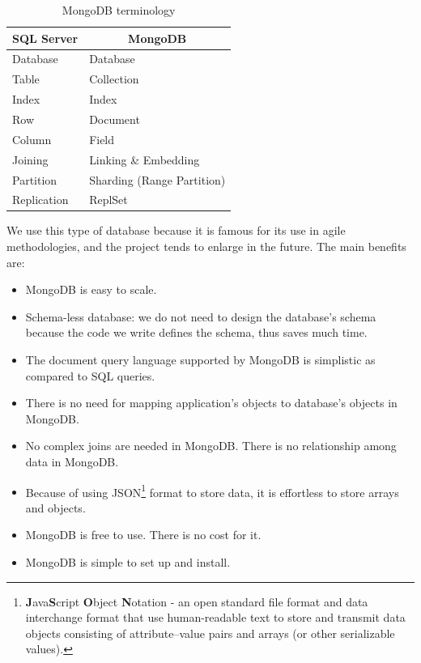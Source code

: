 \begin{table}[H]
	\centering
    \begin{tabular}{|l|l|}
        \hline
        \multicolumn{1}{c}{\bfseries SQL Server} & \multicolumn{1}{c}{\bfseries MongoDB} \\ \hline
        \multicolumn{1}{|l|}{Database}  & \multicolumn{1}{l|}{Database} \\ \hline
        \multicolumn{1}{|l|}{Table}  & \multicolumn{1}{l|}{Collection} \\ \hline
        \multicolumn{1}{|l|}{Index}  & \multicolumn{1}{l|}{Index} \\ \hline
        \multicolumn{1}{|l|}{Row}  & \multicolumn{1}{l|}{Document} \\ \hline
        \multicolumn{1}{|l|}{Column}  & \multicolumn{1}{l|}{Field} \\ \hline
        \multicolumn{1}{|l|}{Joining}  & \multicolumn{1}{l|}{Linking \& Embedding} \\ \hline
        \multicolumn{1}{|l|}{Partition}  & \multicolumn{1}{l|}{Sharding (Range Partition)} \\ \hline
        \multicolumn{1}{|l|}{Replication}  & \multicolumn{1}{l|}{ReplSet} \\ \hline
    \end{tabular}
	\caption{MongoDB terminology}
	\label{tab:mongoDB_terminology}
\end{table}

We use this type of database because it is famous for its use in agile methodologies, and the project tends to enlarge in the future. The main benefits are:
\begin{itemize}
	\item MongoDB is easy to scale.
	\item Schema-less database: we do not need to design the database's schema because the code we write defines the schema, thus saves much time.
	\item The document query language supported by MongoDB is simplistic as compared to SQL queries.
	\item There is no need for mapping application's objects to database's objects in MongoDB.
	\item No complex joins are needed in MongoDB. There is no relationship among data in MongoDB.
	\item Because of using JSON\footnote{\textbf{J}ava\textbf{S}cript \textbf{O}bject \textbf{N}otation - an open standard file format and data interchange format that use human-readable text to store and transmit data objects consisting of attribute–value pairs and arrays (or other serializable values).\citep{wiki_json}} format to store data, it is effortless to store arrays and objects.
	\item MongoDB is free to use. There is no cost for it.
	\item MongoDB is simple to set up and install.
\end{itemize}

